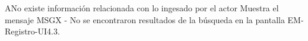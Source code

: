 \begin{UCtrayectoriaA}{A}{No existe información relacionada con lo ingesado por el actor}
	\UCpaso Muestra el mensaje MSGX - No se encontraron resultados de la búsqueda en la pantalla EM-Registro-UI4.3.
\end{UCtrayectoriaA}
